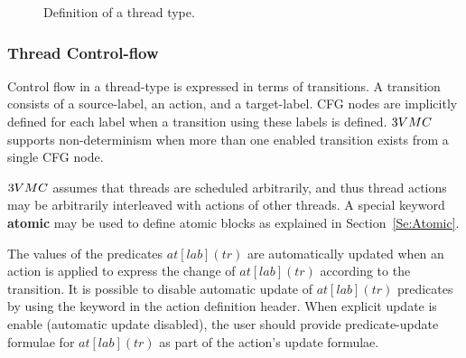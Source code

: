 \begin{figure}
\begin{center}
\end{center}
\caption{\label{Fi:ThreadDef}Definition of a thread type.}
\end{figure}


\subsubsection{Thread Control-flow}

Control flow in a thread-type is expressed in terms of
transitions. A transition consists of a source-label, an action,
and a target-label. CFG nodes are implicitly defined for each
label when a transition using these labels is defined. $\tvmc$
supports non-determinism when more than one enabled transition
exists from a single CFG node.

$\tvmc$ assumes that threads are scheduled arbitrarily, and thus
thread actions may be arbitrarily interleaved with actions of
other threads. A special keyword \textbf{atomic} may be used to
define atomic blocks as explained in Section~\ref{Se:Atomic}.

The values of the predicates $at[lab](tr)$ are automatically
updated when an action is applied to express the change of
$at[lab](tr)$ according to the transition. It is possible to
disable automatic update of $at[lab](tr)$ predicates by using the
keyword \tvexplicitat in the action definition header. When
explicit update is enable (automatic update disabled), the user
should provide predicate-update formulae for $at[lab](tr)$ as part
of the action's update formulae.

